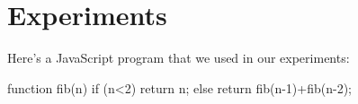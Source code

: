\section{Experiments}

Here's a JavaScript program that we used in our experiments:

\medskip

\literal{\small}
function fib(n)
{
  if (n<2)
    return n;
  else
    return fib(n-1)+fib(n-2);
}
 
